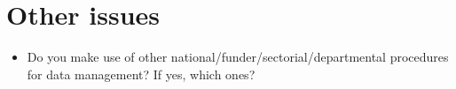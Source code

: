\documentclass{article}
\begin{document}
\section{Other issues}
\begin{itemize}
    \item Do you make use of other national/funder/sectorial/departmental procedures for data management? If yes, which ones?
\end{itemize}

\end{document}
